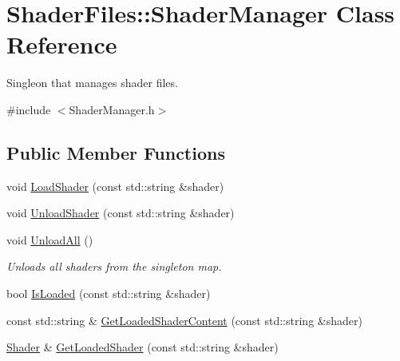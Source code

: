 \hypertarget{class_shader_files_1_1_shader_manager}{}\section{Shader\+Files\+::Shader\+Manager Class Reference}
\label{class_shader_files_1_1_shader_manager}


Singleon that manages shader files.  




{\ttfamily \#include $<$Shader\+Manager.\+h$>$}

\subsection*{Public Member Functions}
\begin{DoxyCompactItemize}
\item 
void \mbox{\hyperlink{class_shader_files_1_1_shader_manager_abcee9b4822ed9c362c0266d61ed99be6}{Load\+Shader}} (const std\+::string \&shader)
\item 
void \mbox{\hyperlink{class_shader_files_1_1_shader_manager_a58fa6395429ed76613b1c70dec844c09}{Unload\+Shader}} (const std\+::string \&shader)
\item 
\mbox{\label{class_shader_files_1_1_shader_manager_a956576d9fabc0bb2be01fc23287cc942}} 
void \mbox{\hyperlink{class_shader_files_1_1_shader_manager_a956576d9fabc0bb2be01fc23287cc942}{Unload\+All}} ()
\begin{DoxyCompactList}\small\item\em Unloads all shaders from the singleton map. \end{DoxyCompactList}\item 
bool \mbox{\hyperlink{class_shader_files_1_1_shader_manager_a4f0f22c76362af7b485116517a38415f}{Is\+Loaded}} (const std\+::string \&shader)
\item 
const std\+::string \& \mbox{\hyperlink{class_shader_files_1_1_shader_manager_a82aa01b675a8ef29aa1283f86574166e}{Get\+Loaded\+Shader\+Content}} (const std\+::string \&shader)
\item 
\mbox{\hyperlink{class_shader_files_1_1_shader}{Shader}} \& \mbox{\hyperlink{class_shader_files_1_1_shader_manager_a96cd9397c9e932cd69fac3ce4363dabe}{Get\+Loaded\+Shader}} (const std\+::string \&shader)
\end{DoxyCompactItemize}
